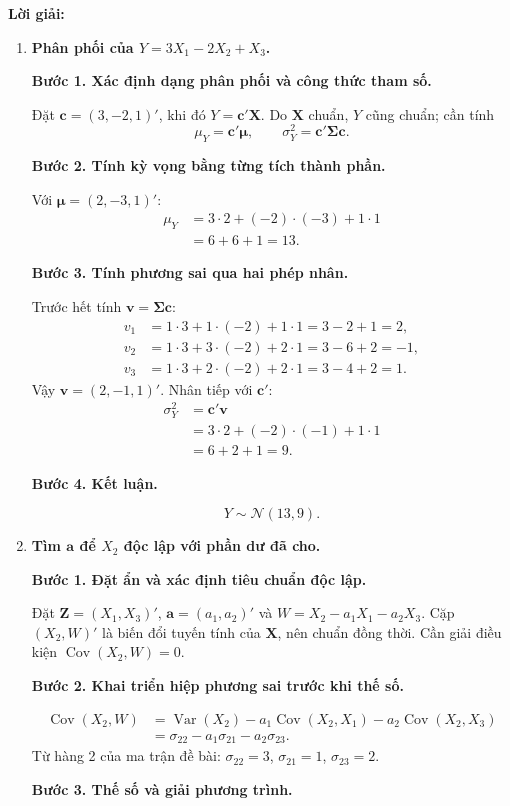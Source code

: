 \documentclass[11pt,a4paper]{article}
\renewcommand{\boldsymbol}[1]{\symbf{#1}}
\newenvironment{solution}{%
  \par\medskip\noindent\textbf{Lời giải:}\par\nopagebreak[4]\smallskip\noindent\ignorespaces
}{\par}
\newcommand{\answer}[1]{\boxed{#1}}
\newcommand{\step}[2]{\par\medskip\noindent\textbf{Bước #1. #2}\par\nopagebreak[4]\smallskip\noindent}
\begin{document}
\begin{solution}
\begin{enumerate}[label=\textbf{\alph*)}]
\item \textbf{Phân phối của $Y=3X_1-2X_2+X_3$.}\par\nopagebreak[4]
\step{1}{Xác định dạng phân phối và công thức tham số.}
Đặt $\mathbf{c}=(3,-2,1)'$, khi đó $Y=\mathbf{c}'\mathbf{X}$.
Do $\mathbf{X}$ chuẩn, $Y$ cũng chuẩn; cần tính
\[
\mu_Y=\mathbf{c}'\boldsymbol{\mu},\qquad
\sigma_Y^2=\mathbf{c}'\boldsymbol{\Sigma}\mathbf{c}.
\]
\step{2}{Tính kỳ vọng bằng từng tích thành phần.}
Với $\boldsymbol{\mu}=(2,-3,1)'$:
\begin{align*}
\mu_Y&=3\cdot2+(-2)\cdot(-3)+1\cdot1\\
&=6+6+1=13.
\end{align*}
\step{3}{Tính phương sai qua hai phép nhân.}
Trước hết tính $\mathbf{v}=\boldsymbol{\Sigma}\mathbf{c}$:
\begin{align*}
v_1&=1\cdot3+1\cdot(-2)+1\cdot1=3-2+1=2,\\
v_2&=1\cdot3+3\cdot(-2)+2\cdot1=3-6+2=-1,\\
v_3&=1\cdot3+2\cdot(-2)+2\cdot1=3-4+2=1.
\end{align*}
Vậy $\mathbf{v}=(2,-1,1)'$. Nhân tiếp với $\mathbf{c}'$:
\begin{align*}
\sigma_Y^2&=\mathbf{c}'\mathbf{v}\\
&=3\cdot2+(-2)\cdot(-1)+1\cdot1\\
&=6+2+1=9.
\end{align*}
\step{4}{Kết luận.}
\[
Y\sim\answer{\mathcal{N}(13,9)}.
\]
\item \textbf{Tìm $\mathbf{a}$ để $X_2$ độc lập với phần dư đã cho.}\par\nopagebreak[4]
\step{1}{Đặt ẩn và xác định tiêu chuẩn độc lập.}
Đặt $\mathbf{Z}=(X_1,X_3)'$, $\mathbf{a}=(a_1,a_2)'$ và
$W=X_2-a_1X_1-a_2X_3$.
Cặp $(X_2,W)'$ là biến đổi tuyến tính của $\mathbf{X}$, nên chuẩn đồng thời.
Cần giải điều kiện $\operatorname{Cov}(X_2,W)=0$.
\step{2}{Khai triển hiệp phương sai trước khi thế số.}
\begin{align*}
\operatorname{Cov}(X_2,W)
&=\operatorname{Var}(X_2)-a_1\operatorname{Cov}(X_2,X_1)
-a_2\operatorname{Cov}(X_2,X_3)\\
&=\sigma_{22}-a_1\sigma_{21}-a_2\sigma_{23}.
\end{align*}
Từ hàng 2 của ma trận đề bài:
$\sigma_{22}=3$, $\sigma_{21}=1$, $\sigma_{23}=2$.
\step{3}{Thế số và giải phương trình.}
\begin{align*}

\end{align*}
\end{enumerate}
\end{solution}
\end{document}
